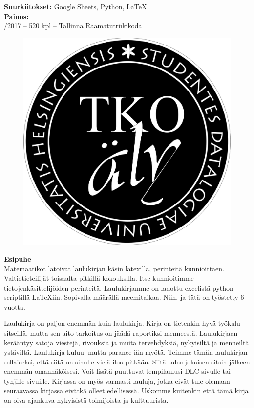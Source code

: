 \noindent
\textbf{Suurkiitokset:} Google Sheets, Python, \LaTeX \\

\noindent
\textbf{Painos:} \\
/2017 -- 520 kpl -- Tallinna Raamatutrükikoda \\
\newpage

\afterpage{\blankpage}
\begin{figure}[h!]
\centering
\includegraphics[scale=0.4]{graphics/logo.png}
\end{figure}

\newpage

\textbf{Esipuhe}
\\

Matemaatikot latoivat laulukirjan käsin latexilla, perinteitä kunnioittaen.
Valtiotieteilijät toisaalta pitkillä kokouksilla. Itse kunnioitimme
tietojenkäsittelijöiden perinteitä. Laulu\-kirjamme on ladottu excelistä
python-scriptillä \LaTeX{}iin. Sopivalla määrällä mee\-mi\-taikaa. Niin, ja tätä on työstetty 6 vuotta.

Laulukirja on paljon enemmän kuin laulukirja. Kirja on tieten\-kin hyvä työkalu
sitseillä, mutta sen aito tarkoitus on jäädä ra\-por\-tik\-si menneestä. Laulukirjaan
kerääntyy satoja viestejä, rivouksia ja muita tervehdyksiä, nykyisiltä ja
menneiltä ystäviltä. Laulukirja kuluu, mutta paranee iän myötä. Teimme tämän
laulukirjan sel\-lai\-sek\-si, että siitä on sinulle vielä iloa pitkään. Siitä tulee
jokaisen sitsin jälkeen enemmän omannäköisesi. Voit lisätä puuttuvat lempi\-laulusi DLC-sivulle tai tyhjille sivuille.
Kirjassa on myös varmasti lauluja, jotka eivät tule olemaan seuraavassa
kirjassa eivätkä olleet edellisessä. Uskomme kuitenkin että tämä kirja on oiva
ajankuva nykyisistä toimijoista ja kulttuurista.

